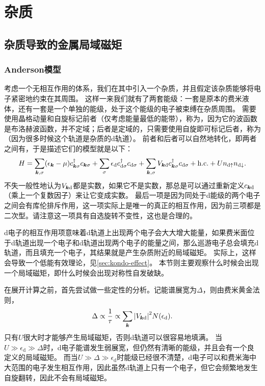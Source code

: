 \section{杂质}

\subsection{杂质导致的金属局域磁矩}

\subsubsection{Anderson模型}\label{sec:anderson-model}

考虑一个无相互作用的体系，我们在其中引入一个杂质，并且假定该杂质能够将电子紧密地约束在其周围。
这样一来我们就有了两套能级：一套是原本的费米液体，还有一套是一个单独的能级，处于这个能级的电子被束缚在杂质周围。
需要使用晶格动量和自旋标记前者（仅考虑能量最低的能带），称为，因为它的波函数是布洛赫波函数，并不定域；后者是定域的，只需要使用自旋即可标记后者，称为（因为很多时候这个轨道是杂质的d轨道）。
前者和后者可以自然地转化，即两者之间有，于是描述它们的模型就是以下：
\begin{equation}
    {H} = \sum_{\vb*{k}, \sigma} (\epsilon_{\vb*{k}} - \mu) {c}_{\vb*{k}\sigma}^\dagger {c}_{\vb*{k} \sigma} + \sum_\sigma \epsilon_\text{d} {c}_{\text{d}\sigma}^\dagger {c}_{\text{d} \sigma} + \sum_{\vb*{k}, \sigma} V_{\vb*{k} \text{d}} {c}_{\vb*{k} \sigma}^\dagger {c}_{\text{d} \sigma} + \text{h.c.} + U {n}_{\text{d} \uparrow} {n}_{\text{d} \downarrow}.
    \label{eq:impurity-anderson}
\end{equation}
不失一般性地认为$V_{\vb*{k} \text{d}}$都是实数，如果它不是实数，那总是可以通过重新定义${c}_{\vb*{k} \text{d}}$（乘上一个复数因子）来让它变成实数。
最后一项是因为同处于d能级的两个电子之间会有库伦排斥作用，这一项实际上是唯一的真正的相互作用，因为前三项都是二次型。请注意这一项具有自选旋转不变性，这也是合理的。

d电子的相互作用项意味着d轨道上出现两个电子会大大增大能量，如果费米面位于d轨道出现一个电子和d轨道出现两个电子的能量之间，那么巡游电子总会填充d轨道，而且填充一个电子，其结果就是产生杂质附近的局域磁矩。
实际上，这样会导致一个低能有效理论，见\autoref{sec:kondo-effect}。
本节则主要观察什么时候会出现一个局域磁矩，即什么时候会出现对称性自发破缺。

在展开计算之前，首先尝试做一些定性的分析。记能谱展宽为$\Delta$，则由费米黄金法则，
\[
    \Delta \propto \frac{1}{\tau} \propto \sum_{\vb*{k}} \abs{V_{\vb*{k} \text{d}}}^2 N(\epsilon_\text{d}).
\]
只有$U$很大时才能够产生局域磁矩，否则d轨道可以很容易地填满。
当$U \gg \epsilon_\text{d} \gg \Delta$时，d电子能谱发生弱展宽，但仍然有清晰的能级，并且会有一个良定义的局域磁矩。
而当$U \gg \Delta \gg \epsilon_\text{d}$时能级已经很不清楚，d电子可以和费米海中大范围的电子发生相互作用，因此虽然d轨道上只有一个电子，但它会频繁地发生自旋翻转，因此不会有局域磁矩。

